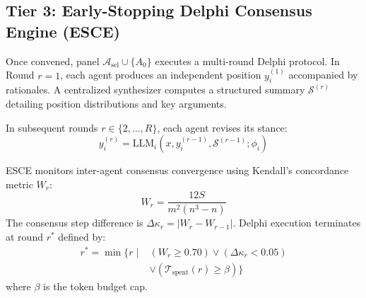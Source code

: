 \documentclass[conference]{IEEEtran}
\begin{document}
\subsection{Tier 3: Early-Stopping Delphi Consensus Engine (ESCE)}
Once convened, panel $\mathcal{A}_{\text{sel}} \cup \{A_0\}$ executes a multi-round Delphi protocol. In Round $r=1$, each agent produces an independent position $y_i^{(1)}$ accompanied by rationales. A centralized synthesizer computes a structured summary $\mathcal{S}^{(r)}$ detailing position distributions and key arguments.

In subsequent rounds $r \in \{2, \dots, R\}$, each agent revises its stance:
\begin{equation}
y_i^{(r)} = \text{LLM}_i\left(x, y_i^{(r-1)}, \mathcal{S}^{(r-1)}; \phi_i\right)
\end{equation}

ESCE monitors inter-agent consensus convergence using Kendall's concordance metric $W_r$:
\begin{equation}
W_r = \frac{12 S}{m^2 (n^3 - n)}
\end{equation}
The consensus step difference is $\Delta \kappa_r = |W_r - W_{r-1}|$. Delphi execution terminates at round $r^*$ defined by:
\begin{equation}
\begin{split}
r^* = \min \bigl\{ r \;\big|\; & (W_r \ge 0.70) \lor (\Delta \kappa_r < 0.05) \\
& \lor (\mathcal{T}_{\text{spent}}(r) \ge \beta) \bigr\}
\end{split}
\end{equation}
where $\beta$ is the token budget cap.
\end{document}
